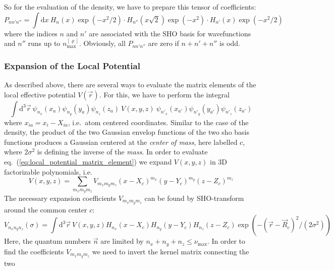 \documentclass[oribibl]{llncs}
\newcommand{\um}[1]{_{\mathrm{#1}}}
\newcommand{\numax}{\nu\um{max}}
\begin{document}
So for the evaluation of the density,
we have to prepare this tensor of coefficients:
\begin{equation}
	P_{nn'n''} = \int \mathrm d x \ H_{n}(x) \exp(-x^2/2) \cdot H_{n''}(x\sqrt{2}) \exp(-x^2) \cdot H_{n'}(x) \exp(-x^2/2)
\end{equation}
where the indices $n$ and $n'$ are associated with the SHO basis for wavefunctions
and $n''$ runs up to $n\um{max}^{[\varrho]}$. 
Obviously, all $P_{nn'n''}$ are zero if $n + n' + n''$ is odd.

\subsubsection{Expansion of the Local Potential}
As described above, there are several ways to evaluate the matrix elements of the local effective potential $V(\vec r)$.
For this, we have to perform the integral
\begin{equation}
	\int \mathrm d^3 \vec r  \  \psi_{n_x}(x_a)\psi_{n_y}(y_a)\psi_{n_z}(z_a)  \  V(x,y,z) \ 
	                            \psi_{n'_x}(x_{a'})\psi_{n'_y}(y_{a'})\psi_{n'_z}(z_{a'})
	                            \label{eq:local_potential_matrix_element}
\end{equation}
where $x_{ia} = x_{i} - X_{ia}$, i.e.~atom centered coordinates.
Similar to the case of the density, the product of the two Gaussian envelop functions of the 
two \ac{sho} basis functions produces a Gaussian centered at the \emph{center of mass}, here labelled $c$, where
$2\sigma^2$ is defining the inverse of the \emph{mass}.
In order to evaluate eq.~(\ref{eq:local_potential_matrix_element}) we
expand $V(x,y,z)$ in 3D factorizable polynomials, i.e.
\begin{equation}
	V(x,y,z) = \sum_{m_x m_y m_z} V_{m_x m_y m_z} (x - X_c)^{m_x} (y - Y_c)^{m_y} (z - Z_c)^{m_z}
	                            \label{eq:local_potential_polynomial_expansion}
\end{equation}
The necessary expansion coefficients $V_{m_x m_y m_z}$ can be found by SHO-transform around the common center $c$:
\begin{equation}
	V_{n_x n_y n_z}(\sigma) = \int \mathrm d^3 \vec r  \   V(x,y,z) H_{n_x}(x - X_c) H_{n_y}(y - Y_c) H_{n_z}(z - Z_c) 
		\exp(-(\vec r - \vec R_c)^2/(2 \sigma^2))
	                            \label{eq:local_potential_projection}
\end{equation}
Here, the quantum numbers $\vec n$ are limited by $n_x + n_y + n_z \leq \numax$.
In order to find the coefficients $V_{m_x m_y m_z}$ we need to invert the kernel matrix connecting the two
\end{document}
